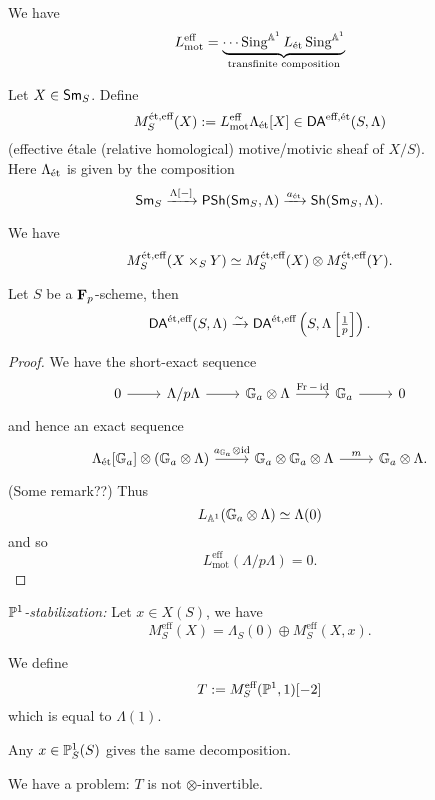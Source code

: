 \begin{lemma}
We have
\[
L_{\text{mot}}^{\text{eff}} = \underbrace{\cdots
\Sing^{\Aff^{1}}L_{\text{\'et}}\Sing^{\Aff^{1}}}_{\text{transfinite composition}}
\]
\end{lemma}
\begin{definition}
Let $X\in \Sm_S$. Define
\[
M_S^{\text{\'et},\text{eff}}(X) \defeq
L_{\text{mot}}^{\text{eff}}\Lambda_{\text{\'et}}[X]\in \cat{DA}^{\text{eff},\text{\'et}}(S,\Lambda)
\]
(effective \'etale (relative homological) motive/motivic sheaf of $X/S$).\\
Here $\Lambda_{\text{\text{ét}}}$ is given by the composition
\[ \Sm_S\xrightarrow{\Lambda[-]}
\PSh(\Sm_S,\Lambda)\xrightarrow{a_{\text{ét}}}\Sh(\Sm_S,\Lambda). \]

\end{definition}
We have
\[
M_S^{\text{\'et},\text{eff}}(X\times_S Y) \isoto M_S^{\text{\'et},\text{eff}}(X) \otimes
M_S^{\text{\'et},\text{eff}}(Y).
\]
\begin{proposition}
Let $S$ be a $\F_p$-scheme, then
\[
\cat{DA}^{\text{\'et},\text{eff}}(S,\Lambda) \simto
\cat{DA}^{\text{\'et},\text{eff}}\left( S,\Lambda\left[ \tfrac{1}{p} \right]  \right) .
\]
\end{proposition}
\begin{proof}
We have the short-exact sequence
\[
\begin{tikzcd}
0 \ar[r] & \Lambda / p\Lambda \ar[r] & \Ga \otimes \Lambda \ar[r,"\Fr-\id"] & \Ga \ar[r] & 0
\end{tikzcd}
\]
and hence an exact sequence %
\[
\begin{tikzcd}
\Lambda_{\text{\'et}}[\Ga] \otimes(\Ga\otimes \Lambda) \ar[r,"a_{\Ga}\otimes \id"] &
\Ga\otimes \Ga\otimes \Lambda \ar[r,"m"] & \Ga\otimes \Lambda.
\end{tikzcd}
\]
(Some remark??) Thus
\[
L_{\Aff^{1}}(\Ga\otimes\Lambda) \isoto \Lambda(0)
\]
and so
\[
L_{\text{mot}}^{\text{eff}}(\Lambda /p\Lambda) = 0.
\]
\end{proof}

\emph{$\P^{1}$-stabilization:} Let $x\in X(S)$, we have
\[
M_S^{\text{eff}}(X) = \Lambda_S(0) \oplus M_{S}^{\text{eff}}(X,x).
\]
\begin{definition}
We define
\[
T \defeq M_S^{\text{eff}}(\P^{1},1)[-2]
\]
which is equal to $\Lambda(1).$
\end{definition}
\begin{exercise}
Any $x\in \P^{1}_S(S)$ gives the same decomposition.
\end{exercise}
We have a problem: $T$ is not $\otimes$-invertible.

